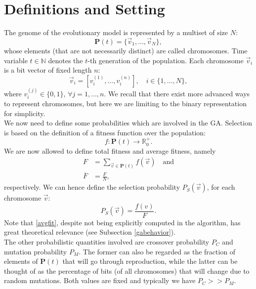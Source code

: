 \documentclass[%
    corpo=11pt,
    twoside,
    stile=classica,
    oldstyle,
    autoretitolo,
    tipotesi=magistrale,
    greek,
    evenboxes,
    english
]{toptesi}
\begin{document}
\section{Definitions and Setting}
The genome of the evolutionary model is represented by a multiset of size $N$:
\begin{equation}
\textbf{P}(t) = \{\vec{v}_1, \dots, \vec{v}_N \},
\end{equation}
whose elements (that are not necessarily distinct) are called chromosomes. Time variable $t\in \mathbb{N}$ denotes the $t$-th generation of the population. Each chromosome $\vec{v}_i$ is a bit vector of fixed length $n$:
\begin{equation}
\vec{v}_i = \left[v_i^{(1)}, \dots, v_i^{(n)} \right], \quad i \in \{1, \dots, N\},
\end{equation}
where $v_i^{(j)} \in \{0,1\}$, $\forall j = 1, \dots, n$. We recall that there exist more advanced ways to represent chromosomes, but here we are limiting to the binary representation for simplicity. \\
We now need to define some probabilities which are involved in the GA. Selection is based on the definition of a fitness function over the population:
\begin{equation}
f: \textbf{P}(t) \longrightarrow \mathbb{R}_0^{+}.
\end{equation}
We are now allowed to define total fitness and average fitness, namely
\begin{align}
F &= \sum_{\vec{v}\in \textbf{P}(t)}f(\vec{v}) \quad \text{and} \\
\overline{F} &= \frac{F}{N}, \label{avgfit}
\end{align}
respectively. We can hence define the selection probability $P_S(\vec{v})$, for each chromosome $\vec{v}$:
\begin{equation}
P_S(\vec{v}) = \frac{f(v)}{F}.
\end{equation}
Note that \eqref{avgfit}, despite not being explicitly computed in the algorithm, has great theoretical relevance (see Subsection \ref{gabehavior}). \\
The other probabilistic quantities involved are crossover probability $P_C$ and mutation probability $P_M$. The former can also be regarded as the fraction of elements of $\textbf{P}(t)$ that will go through reproduction, while the latter can be thought of as the percentage of bits (of all chromosomes) that will change due to random mutations. Both values are fixed and typically we have $P_C >> P_M$.
\newpage
\end{document}
